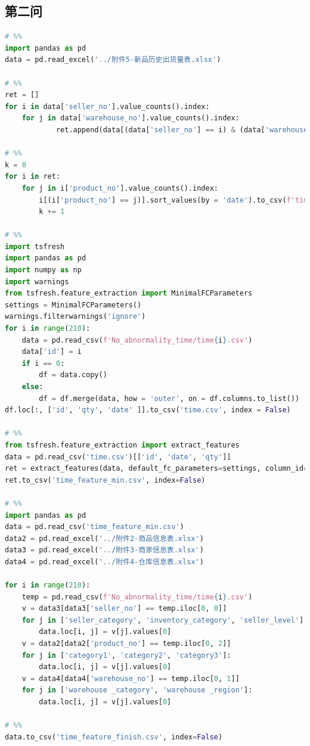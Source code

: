 \documentclass[withoutpreface,bwprint]{cumcmthesis}
\begin{document}
\subsection*{第二问}
\begin{lstlisting}[language=python]
# %%
import pandas as pd
data = pd.read_excel('../附件5-新品历史出货量表.xlsx')

# %%
ret = []
for i in data['seller_no'].value_counts().index:
    for j in data['warehouse_no'].value_counts().index:
            ret.append(data[(data['seller_no'] == i) & (data['warehouse_no'] == j)])

# %%
k = 0
for i in ret:
    for j in i['product_no'].value_counts().index:
        i[(i['product_no'] == j)].sort_values(by = 'date').to_csv(f'time/time{k}.csv', index = False)
        k += 1

# %%
import tsfresh
import pandas as pd
import numpy as np
import warnings 
from tsfresh.feature_extraction import MinimalFCParameters
settings = MinimalFCParameters()
warnings.filterwarnings('ignore')
for i in range(210):
    data = pd.read_csv(f'No_abnormality_time/time{i}.csv')
    data['id'] = i
    if i == 0:
        df = data.copy()
    else:
        df = df.merge(data, how = 'outer', on = df.columns.to_list())
df.loc[:, ['id', 'qty', 'date' ]].to_csv('time.csv', index = False)

# %%
from tsfresh.feature_extraction import extract_features
data = pd.read_csv('time.csv')[['id', 'date', 'qty']]
ret = extract_features(data, default_fc_parameters=settings, column_id="id", column_sort="date")
ret.to_csv('time_feature_min.csv', index=False)

# %%
import pandas as pd
data = pd.read_csv('time_feature_min.csv')
data2 = pd.read_excel('../附件2-商品信息表.xlsx')
data3 = pd.read_excel('../附件3-商家信息表.xlsx')
data4 = pd.read_excel('../附件4-仓库信息表.xlsx')

for i in range(210):
    temp = pd.read_csv(f'No_abnormality_time/time{i}.csv')
    v = data3[data3['seller_no'] == temp.iloc[0, 0]]
    for j in ['seller_category', 'inventory_category', 'seller_level']:
        data.loc[i, j] = v[j].values[0]
    v = data2[data2['product_no'] == temp.iloc[0, 2]]
    for j in ['category1', 'category2', 'category3']:
        data.loc[i, j] = v[j].values[0]
    v = data4[data4['warehouse_no'] == temp.iloc[0, 1]]
    for j in ['warehouse _category', 'warehouse _region']:
        data.loc[i, j] = v[j].values[0]

# %%
data.to_csv('time_feature_finish.csv', index=False)


\end{lstlisting}
\end{document}
